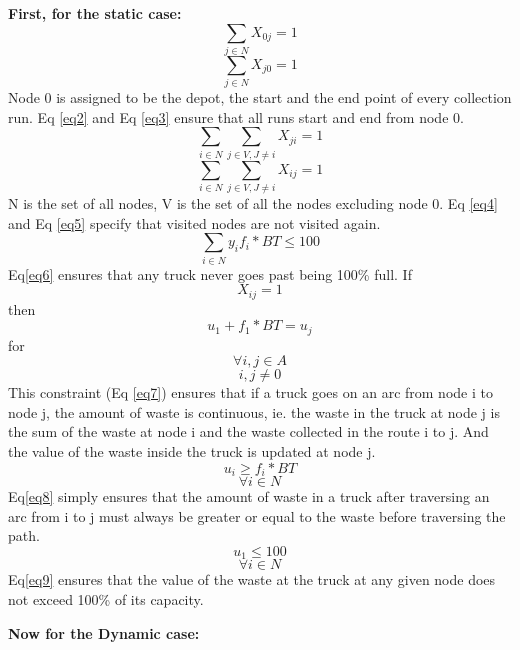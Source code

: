 \documentclass[12pt]{article}
\begin{document}
\textbf{First, for the static case:}
\begin{equation}\label{eq2}
    \sum_{j\in N} X_{0 j}=1
\end{equation}
\begin{equation}\label{eq3}
    \sum_{j\in N} X_{j0}=1
\end{equation}
Node 0 is assigned to be the depot, the start and the end point of every collection run. Eq \eqref{eq2} and Eq \eqref{eq3} ensure that all runs start and end from node 0.
\begin{equation}\label{eq4}
    \sum_{i\in N}\sum_{j\in V, J\ne i} X_{ji}=1
\end{equation}
\begin{equation}\label{eq5}
    \sum_{i\in N}\sum_{j\in V, J\ne i} X_{ij}=1
\end{equation}
N is the set of all nodes, V is the set of all the nodes excluding node 0. Eq \eqref{eq4}
and Eq \eqref{eq5} specify that visited nodes are not visited again.
\begin{equation}\label{eq6}
    \sum_{i\in N}{y_{i}f_i*BT}\le100
\end{equation}
Eq\eqref{eq6} ensures that any truck never goes past being 100\% full.
If
$$ X_{ij}=1$$
then
\begin{equation}\label{eq7}
    u_1+f_1*BT =u_j
\end{equation}
for 
$$ \forall i,j \in A$$
$$ i,j\ne 0$$
This constraint (Eq \eqref{eq7}) ensures that if a truck goes on an arc from node i to node j, the amount of waste is continuous, ie. the waste in the truck at node j is the sum of the waste at node i and the waste collected in the route i to j. And the value of the waste inside the truck is updated at node j.
\begin{equation}\label{eq8}
    u_i\ge f_i*BT
\end{equation}
$$  \forall i\in N$$
Eq\eqref{eq8} simply ensures that the amount of waste in a truck after traversing an arc from i to j must always be greater or equal to the waste before traversing the path.
\begin{equation}\label{eq9}
    u_1\le100
\end{equation}
$$\forall i\in N $$
Eq\eqref{eq9} ensures that the value of the waste at the truck at any given node does not exceed 100\% of its capacity.

\textbf{Now for the Dynamic case:}
\end{document}
